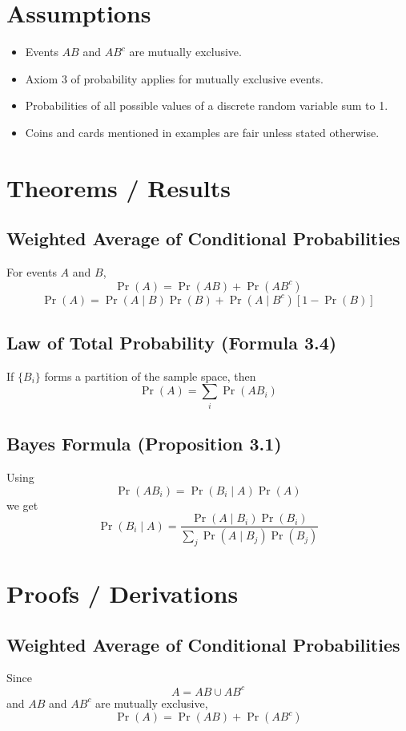\documentclass[11pt]{article}
\begin{document}
\section*{Assumptions}
\begin{itemize}[leftmargin=1.5em]
\item Events $AB$ and $AB^{c}$ are mutually exclusive.
\item Axiom 3 of probability applies for mutually exclusive events.
\item Probabilities of all possible values of a discrete random variable sum to 1.
\item Coins and cards mentioned in examples are fair unless stated otherwise.
\end{itemize}

\section*{Theorems / Results}

\subsection*{Weighted Average of Conditional Probabilities}
For events $A$ and $B$,
\[
\Pr(A) = \Pr(AB) + \Pr(AB^{c})
\]
\[
\Pr(A) = \Pr(A \mid B)\Pr(B) + \Pr(A \mid B^{c})[1 - \Pr(B)]
\]

\subsection*{Law of Total Probability (Formula 3.4)}
If $\{B_i\}$ forms a partition of the sample space, then
\[
\Pr(A) = \sum_i \Pr(AB_i)
\]

\subsection*{Bayes Formula (Proposition 3.1)}
Using
\[
\Pr(AB_i) = \Pr(B_i \mid A)\Pr(A)
\]
we get
\[
\Pr(B_i \mid A) =
\frac{\Pr(A \mid B_i)\Pr(B_i)}{\sum_j \Pr(A \mid B_j)\Pr(B_j)}
\]

\section*{Proofs / Derivations}

\subsection*{Weighted Average of Conditional Probabilities}
Since
\[
A = AB \cup AB^{c}
\]
and $AB$ and $AB^{c}$ are mutually exclusive,
\[
\Pr(A) = \Pr(AB) + \Pr(AB^{c})
\]
\end{document}
